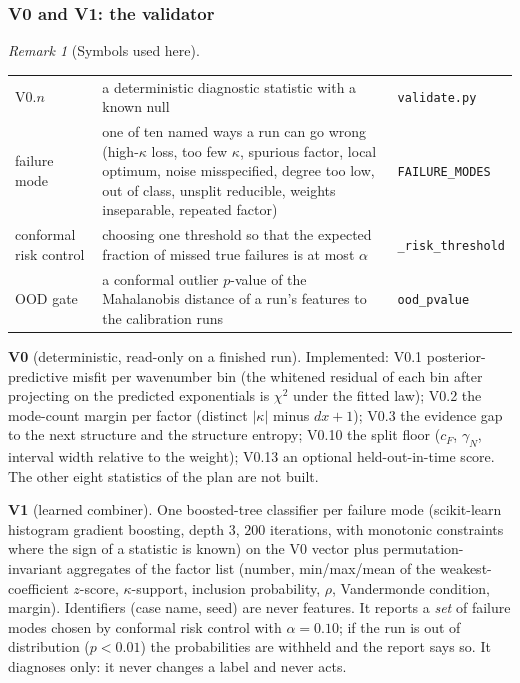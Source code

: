\documentclass[11pt]{article}
\theoremstyle{plain}
\theoremstyle{definition}
\theoremstyle{remark}
\newtheorem{remark}[theorem]{Remark}
\newenvironment{symbols}{\begin{remark}[Symbols used here]}{\end{remark}}
\begin{document}
\subsubsection{V0 and V1: the validator}\label{sec:valid}
\begin{symbols}
\begin{tabular}{@{}L{2.6cm}L{6.0cm}L{4.3cm}@{}}
V0.$n$ & a deterministic diagnostic statistic with a known null & \texttt{validate.py}\\
failure mode & one of ten named ways a run can go wrong (high-$\kappa$ loss, too few $\kappa$, spurious factor, local optimum, noise misspecified, degree too low, out of class, unsplit reducible, weights inseparable, repeated factor) & \texttt{FAILURE\_MODES}\\
conformal risk control & choosing one threshold so that the expected fraction of missed true failures is at most $\alpha$ & \texttt{\_risk\_threshold}\\
OOD gate & a conformal outlier $p$-value of the Mahalanobis distance of a run's features to the calibration runs & \texttt{ood\_pvalue}\\
\end{tabular}
\end{symbols}
\textbf{V0} (deterministic, read-only on a finished run). Implemented: V0.1 posterior-predictive misfit per wavenumber bin (the whitened residual of each bin after projecting on the predicted exponentials is $\chi^2$ under the fitted law); V0.2 the mode-count margin per factor (distinct $|\kappa|$ minus $dx+1$); V0.3 the evidence gap to the next structure and the structure entropy; V0.10 the split floor ($c_F$, $\gamma_N$, interval width relative to the weight); V0.13 an optional held-out-in-time score. The other eight statistics of the plan are not built.

\textbf{V1} (learned combiner). One boosted-tree classifier per failure mode (scikit-learn histogram gradient boosting, depth $3$, $200$ iterations, with monotonic constraints where the sign of a statistic is known) on the V0 vector plus permutation-invariant aggregates of the factor list (number, min/max/mean of the weakest-coefficient $z$-score, $\kappa$-support, inclusion probability, $\rho$, Vandermonde condition, margin). Identifiers (case name, seed) are never features. It reports a \emph{set} of failure modes chosen by conformal risk control with $\alpha=0.10$; if the run is out of distribution ($p<0.01$) the probabilities are withheld and the report says so. It diagnoses only: it never changes a label and never acts.
\end{document}
